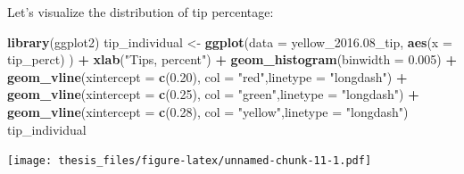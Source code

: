 \documentclass[12pt,twoside]{reedthesis}
\newenvironment{Shaded}{\begin{snugshade}}{\end{snugshade}}
\newcommand{\KeywordTok}[1]{\textcolor[rgb]{0.13,0.29,0.53}{\textbf{#1}}}
\newcommand{\DataTypeTok}[1]{\textcolor[rgb]{0.13,0.29,0.53}{#1}}
\newcommand{\FloatTok}[1]{\textcolor[rgb]{0.00,0.00,0.81}{#1}}
\newcommand{\StringTok}[1]{\textcolor[rgb]{0.31,0.60,0.02}{#1}}
\newcommand{\OperatorTok}[1]{\textcolor[rgb]{0.81,0.36,0.00}{\textbf{#1}}}
\newcommand{\NormalTok}[1]{#1}
\theoremstyle{definition}
\theoremstyle{definition}
\theoremstyle{definition}
\theoremstyle{remark}
\begin{document}
Let's visualize the distribution of tip percentage:
\begin{Shaded}
\begin{Highlighting}[]
\KeywordTok{library}\NormalTok{(ggplot2)}
\NormalTok{tip_individual <-}\StringTok{ }\KeywordTok{ggplot}\NormalTok{(}\DataTypeTok{data =}\NormalTok{ yellow_}\FloatTok{2016.}\NormalTok{08_tip, }\KeywordTok{aes}\NormalTok{(}\DataTypeTok{x =}\NormalTok{ tip_perct) ) }\OperatorTok{+}
\StringTok{  }\KeywordTok{xlab}\NormalTok{(}\StringTok{"Tips, percent"}\NormalTok{) }\OperatorTok{+}
\StringTok{  }\KeywordTok{geom_histogram}\NormalTok{(}\DataTypeTok{binwidth =} \FloatTok{0.005}\NormalTok{) }\OperatorTok{+}\StringTok{ }
\StringTok{  }\KeywordTok{geom_vline}\NormalTok{(}\DataTypeTok{xintercept =} \KeywordTok{c}\NormalTok{(}\FloatTok{0.20}\NormalTok{), }\DataTypeTok{col =} \StringTok{"red"}\NormalTok{,}\DataTypeTok{linetype =} \StringTok{"longdash"}\NormalTok{) }\OperatorTok{+}
\StringTok{  }\KeywordTok{geom_vline}\NormalTok{(}\DataTypeTok{xintercept =} \KeywordTok{c}\NormalTok{(}\FloatTok{0.25}\NormalTok{), }\DataTypeTok{col =} \StringTok{"green"}\NormalTok{,}\DataTypeTok{linetype =} \StringTok{"longdash"}\NormalTok{) }\OperatorTok{+}
\StringTok{  }\KeywordTok{geom_vline}\NormalTok{(}\DataTypeTok{xintercept =} \KeywordTok{c}\NormalTok{(}\FloatTok{0.28}\NormalTok{), }\DataTypeTok{col =} \StringTok{"yellow"}\NormalTok{,}\DataTypeTok{linetype =} \StringTok{"longdash"}\NormalTok{)}
\NormalTok{tip_individual}
\end{Highlighting}
\end{Shaded}
\texttt{[image: thesis\_files/figure-latex/unnamed-chunk-11-1.pdf]}
\end{document}
